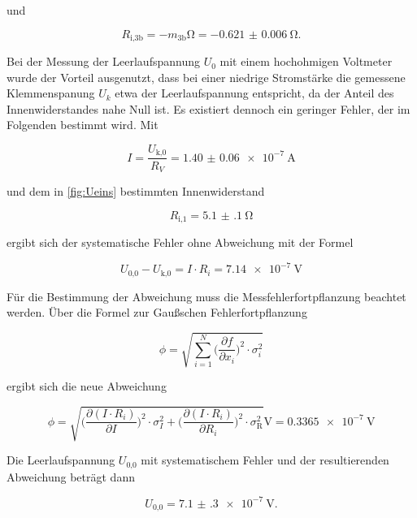   und

  \begin{equation}
    R_\text{i,3b} = -m_\text{3b} \si{\ohm} = \SI{-0.621(6)}{\ohm}.
  \end{equation}

  Bei der Messung der Leerlaufspannung $U_0$ mit einem hochohmigen Voltmeter
  wurde der Vorteil ausgenutzt, dass bei einer niedrige Stromstärke die
  gemessene Klemmenspanung $U_k$ etwa der Leerlaufspannung entspricht, da
  der Anteil des Innenwiderstandes nahe Null ist.
  Es existiert dennoch ein geringer Fehler, der im Folgenden bestimmt wird.
  Mit

  \begin{equation}
    I = \frac{U_\text{k,0}}{R_V} = \SI{1.40(6)e-7}{\A}
  \end{equation}

  und dem in \ref{fig:Ueins} bestimmten Innenwiderstand

  \begin{equation}
    R_\text{i,1} = \SI{5.1(1)}{\ohm}
  \end{equation}

  ergibt sich der systematische Fehler ohne Abweichung mit der Formel

  \begin{equation}
    U_\text{0,0} - U_\text{k,0} = I \cdot R_i = \SI{7.14e-7}{\V}
  \end{equation}

  Für die Bestimmung der Abweichung muss die Messfehlerfortpflanzung
  beachtet werden. Über die Formel zur Gaußschen Fehlerfortpflanzung

  \begin{equation}
    \phi = \sqrt{\sum_{i=1}^{N} \biggl(\frac{\partial f}{\partial x_i}\biggr)^2
    \cdot \sigma_i^2}
  \end{equation}

  ergibt sich die neue Abweichung

  \begin{equation}
    \phi = \sqrt{\biggl(\frac{\partial(I \cdot R_i)}{\partial I}\biggr)^2
    \cdot \sigma_I^2
    + \biggl(\frac{\partial(I \cdot R_i)}{\partial R_i}\biggr)^2 \cdot
    \sigma_\text{R}^2} \si{\V}
    = \SI{0.3365e-7}{\V}
  \end{equation}

  Die Leerlaufspannung $U_\text{0,0}$ mit systematischem Fehler und der
  resultierenden Abweichung beträgt dann

  \begin{equation}
    U_\text{0,0} = \SI{7.1(3)e-7}{\V}.
  \end{equation}

